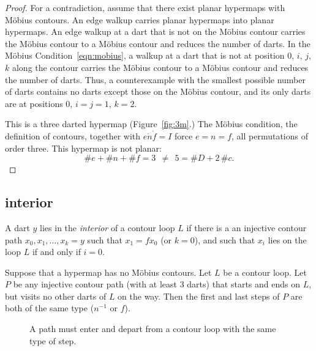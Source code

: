 \begin{proof} For a contradiction, assume that there exist planar
hypermaps with M\"obius contours.  An edge walkup carries
planar hypermaps into planar hypermaps. An edge walkup
at a dart that is not on the M\"obius contour carries the
M\"obius contour to a M\"obius contour 
and reduces the number of darts.  
In the M\"obius Condition~\ref{eqn:mobius},
a walkup at a dart that is not at position $0$, $i$, $j$, $k$
along the contour carries the M\"obius contour to a M\"obius contour
and reduces the number of darts. Thus, a counterexample with
the smallest possible number of darts contains no
darts except those on the M\"obius contour, and its only darts
are at positions $0$, $i=j=1$, $k=2$.

This is a three darted hypermap (Figure~\ref{fig:3m}.)  
The M\"obius condition, the
definition of contours, together with $e\ocirc n\ocirc f=I$ force
$e=n=f$, all permutations of order three.  This hypermap is not planar:
    $$\# e + \# n + \# f = 3~~\ne~~ 5 = \# D + 2\, \#c.$$
\end{proof}



\subsection{interior}

\begin{definition}[interior]\label{def:interior} 
A dart $y$ lies in the {\it interior} of a contour
loop $L$ if there is a an injective contour path
$x_0,x_1,\ldots,x_k=y$ such that $x_1 = f x_0$ (or $k=0$), and
such that $x_i$ lies on the loop $L$ if and only if $i=0$.
\end{definition}

\begin{lemma}
Suppose that a hypermap has no M\"obius contours. Let $L$ be a contour loop.  Let $P$ be any injective contour path (with at least $3$ darts) that starts and ends on $L$, but visits no other darts of $L$ on the way.  Then the first and last steps of $P$ are both of the same type ($n^{-1}$ or $f$).
\end{lemma}

\begin{figure}[htb]
  \centering
  \caption{A path must enter and depart from a contour loop with the same type of step.}
  \label{fig:interior_nf}
\end{figure}


